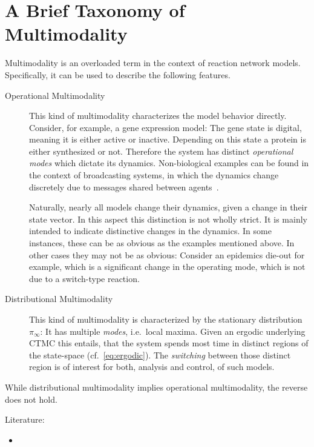 \section{A Brief Taxonomy of Multimodality}\label{sec:multimodality}
Multimodality is an overloaded term in the context of reaction network models.
Specifically, it can be used to describe the following features.
\begin{description}
    \item[Operational Multimodality]
        This kind of multimodality characterizes the model behavior directly.
        Consider, for example, a gene
        expression model:
        The gene state is digital, meaning it is either active or inactive.
        Depending on this state a protein is either synthesized or not.
        Therefore the system has distinct \emph{operational modes}
        which dictate its dynamics.
        Non-biological examples can be found in the
        context of broadcasting systems,
        in which the dynamics change discretely due to messages shared between
        agents~\parencite{bortolussi2020fluid}.

        Naturally, nearly all models change their dynamics,
        given a change in their state vector.
        In this aspect this distinction is not wholly strict.
        It is mainly intended to indicate distinctive changes in the dynamics.
        In some instances, these can be as obvious as the examples mentioned above.
        In other cases they may not be as obvious:
        Consider an epidemics die-out for example, which is a significant change
        in the operating mode, which is not due to a switch-type reaction.
  \item[Distributional Multimodality]
        This kind of multimodality is characterized by the stationary distribution $\pi_{\infty}$:
        It has multiple
        \emph{modes}, i.e.\ local maxima. Given an ergodic underlying \ac{CTMC}
        this entails, that the system spends most time in distinct regions of the
        state-space (cf.\ \eqref{eq:ergodic}).
        The \emph{switching} between those distinct region is of interest
        for both, analysis and control, of such models.
\end{description}
While distributional multimodality implies operational multimodality, the reverse
does not hold.

Literature:
\begin{itemize}
    \item \parencite{siegal2011emergence}
\end{itemize}
